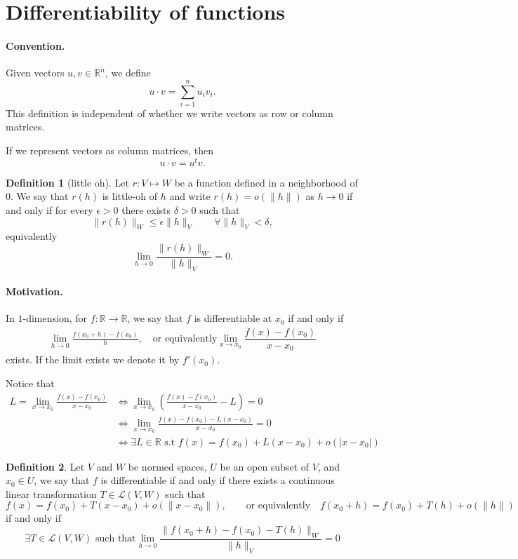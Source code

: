 \documentclass[11pt,openany]{book}
\theoremstyle{plain}
\theoremstyle{definition}
\newtheorem{definition}{Definition}[chapter]
\theoremstyle{remark}
\newcommand{\R}{\mathbb{R}}
\begin{document}
\section{Differentiability of functions}
\paragraph{\bf Convention.} 
Given vectors $u,v\in \mathbb R^n$, we define
$$u\cdot v=\sum_{i=1}^n u_iv_i.$$
This definition is independent of whether we write vectors as row or column matrices.

If we represent vectors as column matrices, then
\[
u\cdot v = u^{t}v.
\]


\begin{definition}[little oh]
    Let $r:V\mapsto W$ be a function defined in a neighborhood of $0$. We say that $r(h)$ is little-oh of $h$ and write $r(h)=o(\|h\|)$ as $h\to 0$ if and only if for every $\epsilon>0$ there exists $\delta>0$ such that 
    $$\|r(h)\|_{W}\leq \epsilon \|h\|_{V}\qquad \forall \|h\|_V<\delta,$$ equivalently
    $$\lim_{h\to 0}\dfrac{\|r(h)\|_W}{\|h\|_V}=0.$$
\end{definition}
\paragraph{\bf Motivation.} In $1$-dimension, for $f: \R \to \R$, we say that $f$ is differentiable at $x_0$ if and only if
    \begin{align*}
    \lim_{h\to 0} \frac{f(x_0+h) - f(x_0)}{h}, \quad \text{or equivalently} \lim_{x\to x_0} \dfrac{f(x)-f(x_0)}{x-x_0}
    \end{align*}
    exists.
    If the limit exists we denote it by $f'(x_0)$.

    Notice that
    \begin{align*}
    L = \lim_{x \to x_0}\frac{f(x)-f(x_0)}{x-x_0} &\iff \lim_{x\to x_0}\left(\frac{f(x)-f(x_0)}{x-x_0}-L\right) = 0 \\
    &\iff \lim_{x\to x_0} \frac{f(x)-f(x_0)- L(x-x_0)}{x-x_0} = 0\\
    &\iff \exists L \in \R \text{ s.t } f(x) = f(x_0)+L(x-x_0) + o(|x-x_0|)
    \end{align*}

\begin{definition}
    Let $V$ and $W$ be normed spaces, $U$ be an open subset of $V$, and $x_0 \in U$, we say that $f$ is differentiable if and only if there exists a continuous linear transformation $T\in \mathcal{L}(V,W)$ such that \[f(x) = f(x_0)+T(x-x_0) + o(\|x-x_0\|),\qquad \text{or equivalently}\quad  f(x_0+h) = f(x_0)+T(h)+o(\|h\|)\]  if and only if \[ \exists T \in \mathcal{L}(V,W) \text{ such that} \lim_{h \to 0}\frac{\|f(x_0+h) - f(x_0) - T(h)\|_W}{\|h\|_V} = 0\]
\end{definition}
\end{document}

